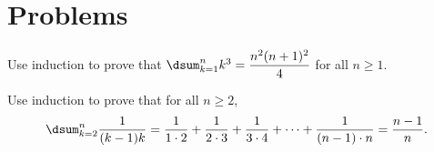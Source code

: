 \section{Problems}

\begin{pro}
Use induction to prove that  $\dsum _{k=1}^n k^3 = \dfrac{n^2(n+1)^2}{4}$ 
for all $n\geq 1$.
\end{pro}

\begin{pro}
Use induction to prove that for all $n\geq 2$,
$$\dsum _{k=2}^n \dfrac{1}{(k-1)k}=\dfrac{1}{1\cdot 2} +
\dfrac{1}{2\cdot 3} + \dfrac{1}{3\cdot 4} + \cdots +
\dfrac{1}{(n-1)\cdot n} = \dfrac{n-1}{n}.$$
\end{pro}

